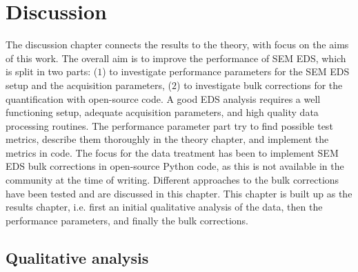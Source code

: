 %
\chapter{Discussion}
\label{ch:discussion}


The discussion chapter connects the results to the theory, with focus on the aims of this work.
The overall aim is to improve the performance of SEM EDS, which is split in two parts:
($1$) to investigate performance parameters for the SEM EDS setup and the acquisition parameters, ($2$) to investigate bulk corrections for the quantification with open-source code.
A good EDS analysis requires a well functioning setup, adequate acquisition parameters, and high quality data processing routines.
The performance parameter part try to find possible test metrics, describe them thoroughly in the theory chapter, and implement the metrics in code.
The focus for the data treatment has been to implement SEM EDS bulk corrections in open-source Python code, as this is not available in the community at the time of writing.
Different approaches to the bulk corrections have been tested and are discussed in this chapter.
This chapter is built up as the results chapter, i.e. first an initial qualitative analysis of the data, then the performance parameters, and finally the bulk corrections.











\section{Qualitative analysis}
\label{discussion:qualitative_analysis}


